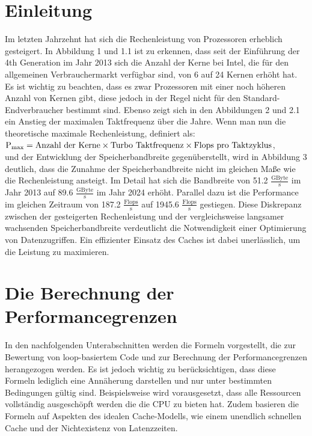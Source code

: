 \documentclass[sigconf,language=english]{acmart}
\begin{document}
\section{Einleitung}
    Im letzten Jahrzehnt hat sich die Rechenleistung von Prozessoren erheblich gesteigert. 
    In Abbildung 1 und 1.1 ist zu erkennen, dass seit der Einführung der 4th Generation im Jahr 2013 \cite{louis-2021} sich die Anzahl der Kerne bei Intel, 
    die für den allgemeinen Verbrauchermarkt verfügbar sind, von 6 auf 24 Kernen erhöht hat. 
    Es ist wichtig zu beachten, dass es zwar Prozessoren mit einer noch höheren Anzahl von Kernen gibt, 
    diese jedoch in der Regel nicht für den Standard-Endverbraucher bestimmt sind. 
    Ebenso zeigt sich in den Abbildungen 2 und 2.1 ein Anstieg der maximalen Taktfrequenz über die Jahre. 
    Wenn man nun die theoretische maximale Rechenleistung, 
    definiert als:\\ $\textnormal{P}_{\textnormal{max}} = \text{Anzahl der Kerne} \times \text{Turbo Taktfrequenz} \times \text{Flops pro Taktzyklus}$,\\und
    der Entwicklung der Speicherbandbreite gegenüberstellt, wird in Abbildung 3 deutlich, 
    dass die Zunahme der Speicherbandbreite nicht im gleichen Maße wie die Rechenleistung ansteigt. 
    Im Detail hat sich die Bandbreite von 51.2 $\frac{\text{GByte}}{\text{s}}$ im Jahr 2013 auf 89.6 $\frac{\text{GByte}}{\text{s}}$ im Jahr 2024 erhöht. 
    Parallel dazu ist die Performance im gleichen Zeitraum von 187.2 $\frac{\text{Flops}}{\text{s}}$ auf 1945.6 $\frac{\text{Flops}}{\text{s}}$ gestiegen. 
    Diese Diskrepanz zwischen der gesteigerten Rechenleistung und der vergleichsweise langsamer wachsenden Speicherbandbreite 
    verdeutlicht die Notwendigkeit einer Optimierung von Datenzugriffen. 
    Ein effizienter Einsatz des Caches ist dabei unerlässlich, um die Leistung zu maximieren.

    \section{Die Berechnung der Performancegrenzen}
    In den nachfolgenden Unterabschnitten werden die Formeln vorgestellt, 
    die zur Bewertung von loop-basiertem Code und zur Berechnung der Performancegrenzen herangezogen werden. 
    Es ist jedoch wichtig zu berücksichtigen, dass diese Formeln lediglich eine Annäherung darstellen 
    und nur unter bestimmten Bedingungen gültig sind. Beispielsweise wird vorausgesetzt, 
    dass alle Ressourcen vollständig ausgeschöpft werden die die CPU zu bieten hat. 
    Zudem basieren die Formeln auf Aspekten des idealen Cache-Modells, 
    wie einem unendlich schnellen Cache und der Nichtexistenz von Latenzzeiten.
\end{document}
